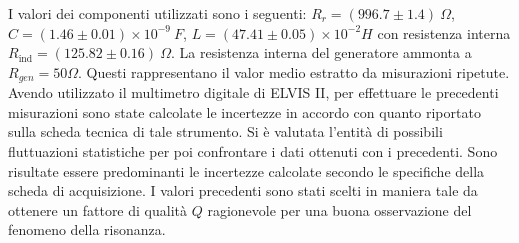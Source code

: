 I valori dei componenti utilizzati sono i seguenti: $R_r = (996.7 \pm 1.4) \ \Omega$, $C = (1.46 \pm 0.01) \times 10^{-9} \ F$,
$L = (47.41 \pm 0.05) \times 10^{-2} H$ con resistenza interna $R_{\text{ind}} = (125.82 \pm 0.16) \ \Omega$. La resistenza interna
del generatore ammonta a $R_{gen} = 50 \Omega$. Questi rappresentano il valor medio estratto da misurazioni ripetute.
Avendo utilizzato il multimetro digitale di ELVIS II, per effettuare le precedenti misurazioni sono state calcolate le
incertezze in accordo con quanto riportato sulla scheda tecnica di tale strumento. Si è valutata l'entità di possibili
fluttuazioni statistiche per poi confrontare i dati ottenuti con i precedenti.
Sono risultate essere predominanti le incertezze calcolate secondo le specifiche della scheda di acquisizione.
I valori precedenti sono stati scelti in maniera tale da ottenere
un fattore di qualità $Q$ ragionevole per una buona osservazione del fenomeno della risonanza.


